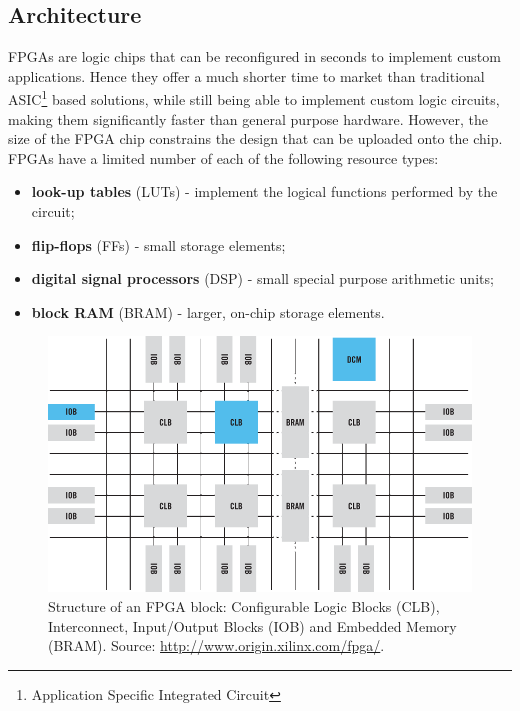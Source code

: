 \subsection{Architecture}

FPGAs are logic chips that can be reconfigured in seconds to implement
custom applications. Hence they offer a much shorter time to market
than traditional ASIC\footnote{Application Specific Integrated
  Circuit} based solutions, while still being able to implement custom
logic circuits, making them significantly faster than general purpose
hardware. However, the size of the FPGA chip constrains the design
that can be uploaded onto the chip. FPGAs have a limited number of
each of the following resource types:

\begin{itemize}
\item \textbf{look-up tables} (LUTs) - implement the logical functions performed by the circuit;
\item \textbf{flip-flops} (FFs) - small storage elements;
\item \textbf{digital signal processors} (DSP) - small special purpose arithmetic units;
\item \textbf{block RAM} (BRAM) - larger, on-chip storage elements.
\end{itemize}

\begin{figure}[ht!]
\centering
\includegraphics[scale=0.4]{figs/fpga-block-structure.png}
\caption{Structure of an FPGA block: Configurable Logic Blocks (CLB),
  Interconnect, Input/Output Blocks (IOB) and Embedded Memory (BRAM). Source:
  \url{http://www.origin.xilinx.com/fpga/}.}
\label{fig:fpga-block-structure}
\end{figure}

